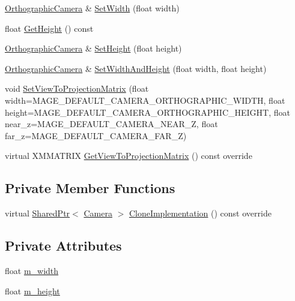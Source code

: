 \begin{DoxyCompactItemize}
\item 
\hyperlink{classmage_1_1_orthographic_camera}{Orthographic\+Camera} \& \hyperlink{classmage_1_1_orthographic_camera_aa38c67d3cfb41fb715bdf71d417bbc0d}{Set\+Width} (float width)
\item 
float \hyperlink{classmage_1_1_orthographic_camera_a596e2cf22fee8cf30139ffe9d4cdcda7}{Get\+Height} () const
\item 
\hyperlink{classmage_1_1_orthographic_camera}{Orthographic\+Camera} \& \hyperlink{classmage_1_1_orthographic_camera_a57cb23f7bee15791f6a73a1244815614}{Set\+Height} (float height)
\item 
\hyperlink{classmage_1_1_orthographic_camera}{Orthographic\+Camera} \& \hyperlink{classmage_1_1_orthographic_camera_a3ba89b58268c56fbebb8904bbe260f2f}{Set\+Width\+And\+Height} (float width, float height)
\item 
void \hyperlink{classmage_1_1_orthographic_camera_a10e09af47e741ab76dc2aa2a03f04c06}{Set\+View\+To\+Projection\+Matrix} (float width=M\+A\+G\+E\+\_\+\+D\+E\+F\+A\+U\+L\+T\+\_\+\+C\+A\+M\+E\+R\+A\+\_\+\+O\+R\+T\+H\+O\+G\+R\+A\+P\+H\+I\+C\+\_\+\+W\+I\+D\+TH, float height=M\+A\+G\+E\+\_\+\+D\+E\+F\+A\+U\+L\+T\+\_\+\+C\+A\+M\+E\+R\+A\+\_\+\+O\+R\+T\+H\+O\+G\+R\+A\+P\+H\+I\+C\+\_\+\+H\+E\+I\+G\+HT, float near\+\_\+z=M\+A\+G\+E\+\_\+\+D\+E\+F\+A\+U\+L\+T\+\_\+\+C\+A\+M\+E\+R\+A\+\_\+\+N\+E\+A\+R\+\_\+Z, float far\+\_\+z=M\+A\+G\+E\+\_\+\+D\+E\+F\+A\+U\+L\+T\+\_\+\+C\+A\+M\+E\+R\+A\+\_\+\+F\+A\+R\+\_\+Z)
\item 
virtual X\+M\+M\+A\+T\+R\+IX \hyperlink{classmage_1_1_orthographic_camera_aedd86e56a0f7bc967ad8d9be2631a0cf}{Get\+View\+To\+Projection\+Matrix} () const override
\end{DoxyCompactItemize}
\subsection*{Private Member Functions}
\begin{DoxyCompactItemize}
\item 
virtual \hyperlink{namespacemage_a1e01ae66713838a7a67d30e44c67703e}{Shared\+Ptr}$<$ \hyperlink{classmage_1_1_camera}{Camera} $>$ \hyperlink{classmage_1_1_orthographic_camera_a5a55280980bb4dc24d4b0213ad22cf64}{Clone\+Implementation} () const override
\end{DoxyCompactItemize}
\subsection*{Private Attributes}
\begin{DoxyCompactItemize}
\item 
float \hyperlink{classmage_1_1_orthographic_camera_aadef4cff19cc1b1ecf427f82bbc3ea6a}{m\+\_\+width}
\item 
float \hyperlink{classmage_1_1_orthographic_camera_a63169098f604874c1b30c4b276b5a3e1}{m\+\_\+height}
\end{DoxyCompactItemize}
